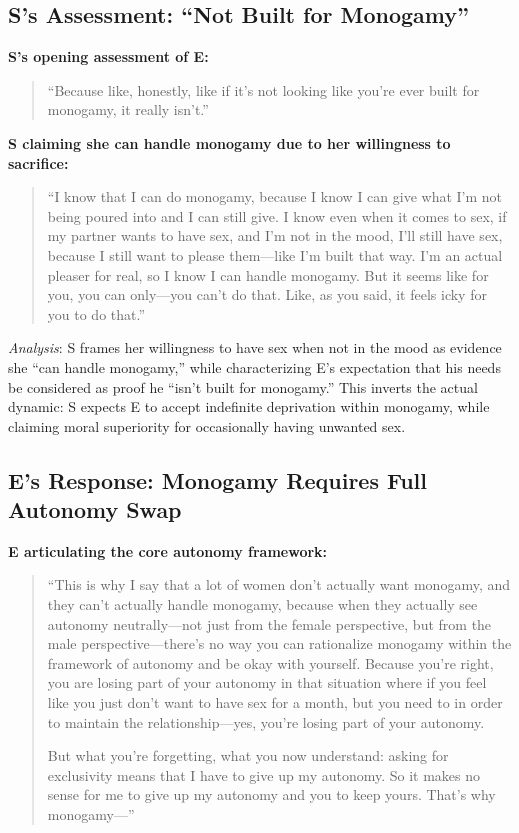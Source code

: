 \documentclass[12pt,openany]{book}
\numberwithin{equation}{chapter}
\begin{document}
\subsection{S's Assessment: ``Not Built for Monogamy''}

\textbf{S's opening assessment of E:}
\begin{quote}
``Because like, honestly, like if it's not looking like you're ever built for monogamy, it really isn't.''
\end{quote}

\textbf{S claiming she can handle monogamy due to her willingness to sacrifice:}
\begin{quote}
``I know that I can do monogamy, because I know I can give what I'm not being poured into and I can still give. I know even when it comes to sex, if my partner wants to have sex, and I'm not in the mood, I'll still have sex, because I still want to please them---like I'm built that way. I'm an actual pleaser for real, so I know I can handle monogamy. But it seems like for you, you can only---you can't do that. Like, as you said, it feels icky for you to do that.''
\end{quote}

\textit{Analysis}: S frames her willingness to have sex when not in the mood as evidence she ``can handle monogamy,'' while characterizing E's expectation that his needs be considered as proof he ``isn't built for monogamy.'' This inverts the actual dynamic: S expects E to accept indefinite deprivation within monogamy, while claiming moral superiority for occasionally having unwanted sex.

\subsection{E's Response: Monogamy Requires Full Autonomy Swap}

\textbf{E articulating the core autonomy framework:}
\begin{quote}
``This is why I say that a lot of women don't actually want monogamy, and they can't actually handle monogamy, because when they actually see autonomy neutrally---not just from the female perspective, but from the male perspective---there's no way you can rationalize monogamy within the framework of autonomy and be okay with yourself. Because you're right, you are losing part of your autonomy in that situation where if you feel like you just don't want to have sex for a month, but you need to in order to maintain the relationship---yes, you're losing part of your autonomy.

But what you're forgetting, what you now understand: asking for exclusivity means that I have to give up my autonomy. So it makes no sense for me to give up my autonomy and you to keep yours. That's why monogamy---''
\end{quote}
\end{document}
